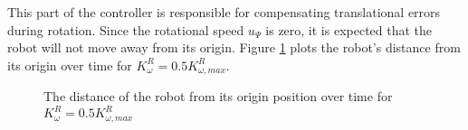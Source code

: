 This part of the controller is responsible for compensating translational errors
during rotation. Since the rotational speed $u_{\Psi}$ is zero, it is
expected that the robot will not move away from its origin. Figure
\ref{fig:10_0.5_max} plots the robot's distance from its origin over time for
$K_{\omega}^R = 0.5 K_{\omega, max}^R$.

\begin{figure}[H]\centering
  \scalebox{0.8}{}
  \caption{The distance of the robot from its origin position over time for
    $K_{\omega}^R = 0.5 K_{\omega, max}^R$}
  \label{fig:10_0.5_max}
\end{figure}
